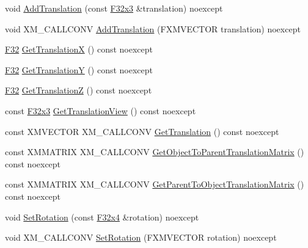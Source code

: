 \begin{DoxyCompactItemize}
\item 
void \mbox{\hyperlink{classmage_1_1_s1_q_t_transform3_d_a527c73d28bed2537291925ef5df491dc}{Add\+Translation}} (const \mbox{\hyperlink{namespacemage_a1e3c7a882af461f161caa1cbddaf1fa2}{F32x3}} \&translation) noexcept
\item 
void X\+M\+\_\+\+C\+A\+L\+L\+C\+O\+NV \mbox{\hyperlink{classmage_1_1_s1_q_t_transform3_d_a61ef9b65abd3cc2b264c00cdb3f1ca9d}{Add\+Translation}} (F\+X\+M\+V\+E\+C\+T\+OR translation) noexcept
\item 
\mbox{\hyperlink{namespacemage_aa97e833b45f06d60a0a9c4fc22ae02c0}{F32}} \mbox{\hyperlink{classmage_1_1_s1_q_t_transform3_d_a369ee13f9132ca21bfaceadb61794877}{Get\+TranslationX}} () const noexcept
\item 
\mbox{\hyperlink{namespacemage_aa97e833b45f06d60a0a9c4fc22ae02c0}{F32}} \mbox{\hyperlink{classmage_1_1_s1_q_t_transform3_d_ae6ba8a09f35b13a6d7f056a099f4f866}{Get\+TranslationY}} () const noexcept
\item 
\mbox{\hyperlink{namespacemage_aa97e833b45f06d60a0a9c4fc22ae02c0}{F32}} \mbox{\hyperlink{classmage_1_1_s1_q_t_transform3_d_a74946246c6228f0eb3734129daeef712}{Get\+TranslationZ}} () const noexcept
\item 
const \mbox{\hyperlink{namespacemage_a1e3c7a882af461f161caa1cbddaf1fa2}{F32x3}} \mbox{\hyperlink{classmage_1_1_s1_q_t_transform3_d_a76ffd5916fe986477c4a02a346cc2363}{Get\+Translation\+View}} () const noexcept
\item 
const X\+M\+V\+E\+C\+T\+OR X\+M\+\_\+\+C\+A\+L\+L\+C\+O\+NV \mbox{\hyperlink{classmage_1_1_s1_q_t_transform3_d_aa5bedc3630d7c229682fe986b1caf7f2}{Get\+Translation}} () const noexcept
\item 
const X\+M\+M\+A\+T\+R\+IX X\+M\+\_\+\+C\+A\+L\+L\+C\+O\+NV \mbox{\hyperlink{classmage_1_1_s1_q_t_transform3_d_a7904c17bbf67be7e82768594b229e257}{Get\+Object\+To\+Parent\+Translation\+Matrix}} () const noexcept
\item 
const X\+M\+M\+A\+T\+R\+IX X\+M\+\_\+\+C\+A\+L\+L\+C\+O\+NV \mbox{\hyperlink{classmage_1_1_s1_q_t_transform3_d_a76b84cc8993f5813b15285555fc5a859}{Get\+Parent\+To\+Object\+Translation\+Matrix}} () const noexcept
\item 
void \mbox{\hyperlink{classmage_1_1_s1_q_t_transform3_d_aef471fb4c0ed7acd18eb101a3e077891}{Set\+Rotation}} (const \mbox{\hyperlink{namespacemage_a851648f37dfb126a2d2f973e102861ad}{F32x4}} \&rotation) noexcept
\item 
void X\+M\+\_\+\+C\+A\+L\+L\+C\+O\+NV \mbox{\hyperlink{classmage_1_1_s1_q_t_transform3_d_a4088c60f246edcd34963b9b7b0caa2ed}{Set\+Rotation}} (F\+X\+M\+V\+E\+C\+T\+OR rotation) noexcept

\end{DoxyCompactItemize}
